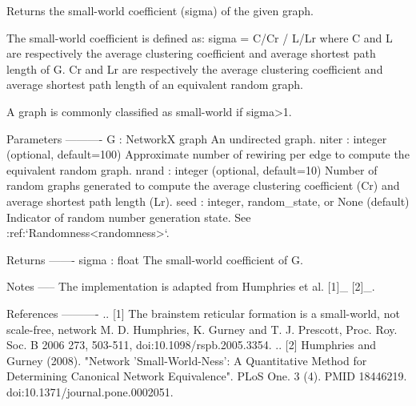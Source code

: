 \begin{DoxyVerb}Returns the small-world coefficient (sigma) of the given graph.

The small-world coefficient is defined as:
sigma = C/Cr / L/Lr
where C and L are respectively the average clustering coefficient and
average shortest path length of G. Cr and Lr are respectively the average
clustering coefficient and average shortest path length of an equivalent
random graph.

A graph is commonly classified as small-world if sigma>1.

Parameters
----------
G : NetworkX graph
    An undirected graph.
niter : integer (optional, default=100)
    Approximate number of rewiring per edge to compute the equivalent
    random graph.
nrand : integer (optional, default=10)
    Number of random graphs generated to compute the average clustering
    coefficient (Cr) and average shortest path length (Lr).
seed : integer, random_state, or None (default)
    Indicator of random number generation state.
    See :ref:`Randomness<randomness>`.

Returns
-------
sigma : float
    The small-world coefficient of G.

Notes
-----
The implementation is adapted from Humphries et al. [1]_ [2]_.

References
----------
.. [1] The brainstem reticular formation is a small-world, not scale-free,
       network M. D. Humphries, K. Gurney and T. J. Prescott,
       Proc. Roy. Soc. B 2006 273, 503-511, doi:10.1098/rspb.2005.3354.
.. [2] Humphries and Gurney (2008).
       "Network 'Small-World-Ness': A Quantitative Method for Determining
       Canonical Network Equivalence".
       PLoS One. 3 (4). PMID 18446219. doi:10.1371/journal.pone.0002051.
\end{DoxyVerb}
 